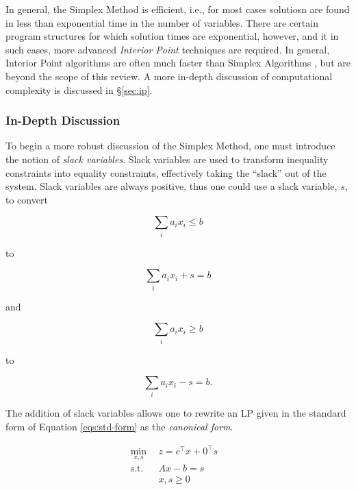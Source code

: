 In general, the Simplex Method is efficient, i.e., for most cases solutiosn are
found in less than exponential time in the number of variables. There are
certain program structures for which solution times are exponential, however,
and it in such cases, more advanced \textit{Interior Point} techniques are
required. In general, Interior Point algorithms are often much faster than
Simplex Algorithms \cite{ferris_linear_2008}, but are beyond the scope of this
review. A more in-depth discussion of computational complexity is discussed
in \S \ref{sec:ip}.

\subsubsection{In-Depth Discussion}
To begin a more robust discussion of the Simplex Method, one must introduce the
notion of \textit{slack variables}. Slack variables are used to transform
inequality constraints into equality constraints, effectively taking the
``slack'' out of the system. Slack variables are always positive, thus one could
use a slack variable, $s$, to convert

\begin{equation}
  \sum_{i} a_i x_i \leq b
\end{equation}

to 

\begin{equation}
  \sum_{i} a_i x_i + s = b
\end{equation}

and

\begin{equation}
  \sum_{i} a_i x_i \geq b
\end{equation}

to 

\begin{equation}
  \sum_{i} a_i x_i - s = b.
\end{equation}

The addition of slack variables allows one to rewrite an LP given in the
standard form of Equation \ref{eqs:std-form} as the \textit{canonical form}.

\begin{subequations}\label{eqs:can-form}
  \begin{align}
    \min_{x, s} \:\: & 
    z =  c^{\top} x + 0^{\top} s
    & \label{eqs:can-form_obj} \\
    \text{s.t.} \:\: &
    A x - b = s
    & \label{eqs:can-form_sup} \\
    &
    x, s \geq 0
    &\label{eqs:can-form_x}
  \end{align}
\end{subequations}


